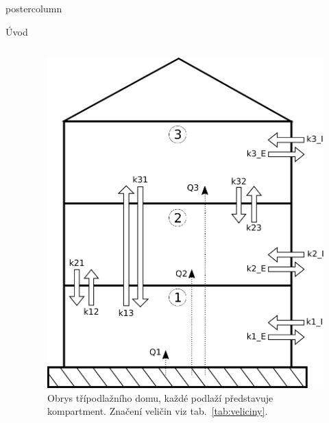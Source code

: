 \documentclass{beamer}
\begin{document}
\begin{frame}
\begin{columns}
\begin{column}{.43\textwidth}
\begin{beamercolorbox}[center]{postercolumn}
\begin{minipage}{.98\textwidth}
{\begin{myblock}{Úvod}
\begin{columns}
\begin{column}{.6\textwidth}
\begin{description}
            \end{description}
        \end{column}
        \begin{column}{.4\textwidth}
            \begin{figure}[h]
                \centering
                \includegraphics[width=\textwidth]{podklady/obrys_domu.pdf}
                \caption{Obrys třípodlažního domu, každé podlaží představuje kompartment. Značení veličin viz tab.~\ref{tab:veliciny}.}
                \label{fig:princip}
            \end{figure}
        \end{column}
    \end{columns}


\end{myblock}}
\end{minipage}
\end{beamercolorbox}
\end{column}
\end{columns}
\end{frame}
\end{document}
